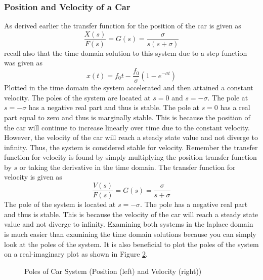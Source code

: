 \subsubsection{Position and Velocity of a Car}

As derived earlier the transfer function for the position of the car is given as 
\begin{equation}
    \frac{X(s)}{F(s)}= G(s) = \frac{\sigma}{s(s+\sigma)}
\end{equation}
recall also that the time domain solution to this system due to a step function was given as 
\begin{equation}
    x(t) = f_0 t - \frac{f_0}{\sigma} (1 - e^{-\sigma t})
\end{equation}
Plotted in the time domain the system accelerated and then attained a constant velocity. The poles of the system are located at $s=0$ and $s=-\sigma$. The pole at $s=-\sigma$ has a negative real part and thus is stable. The pole at $s=0$ has a real part equal to zero and thus is marginally stable. This is because the position of the car will continue to increase linearly over time due to the constant velocity. However, the velocity of the car will reach a steady state value and not diverge to infinity. Thus, the system is considered stable for velocity. Remember the transfer function for velocity is found by simply multiplying the position transfer function by $s$ or taking the derivative in the time domain. The transfer function for velocity is given as
\begin{equation}
    \frac{V(s)}{F(s)}= G(s) = \frac{\sigma}{s+\sigma}
\end{equation}
The pole of the system is located at $s=-\sigma$. The pole has a negative real part and thus is stable. This is because the velocity of the car will reach a steady state value and not diverge to infinity. Examining both systems in the laplace domain is much easier than examining the time domain solutions because you can simply look at the poles of the system. It is also beneficial to plot the poles of the system on a real-imaginary plot as shown in Figure \ref{f:car_poles}.

\begin{figure}[H]
\centering
\begin{subfigure}[b]{0.48\textwidth}
\centering
\end{subfigure}
\hfill
\begin{subfigure}[b]{0.48\textwidth}
\centering
\label{fig:two}
\end{subfigure}
\caption{Poles of Car System (Position (left) and Velocity (right))}
\label{f:car_poles}
\end{figure}

